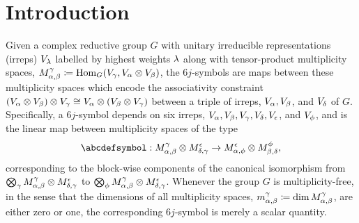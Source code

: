 \documentclass[notitlepage, 10pt]{article}
\begin{document}
\tableofcontents

\section{Introduction}

Given a complex reductive group $G$ with unitary irreducible representations (irreps) $V_{\lambda}$ labelled by highest weights $\lambda$ along with tensor-product multiplicity spaces, $M^{\gamma}_{\alpha,\beta} \coloneqq \operatorname{Hom}_G(V_{\gamma}, V_{\alpha}\otimes V_{\beta})$, the $6j$-symbols are maps between these multiplicity spaces which encode the associativity constraint $(V_\alpha \otimes V_\beta) \otimes V_\gamma \cong V_\alpha \otimes (V_\beta \otimes V_\gamma)$ between a triple of irreps, $V_\alpha, V_\beta$, and $V_\delta$ of $G$.
Specifically, a $6j$-symbol depends on six irreps, $V_{\alpha}, V_{\beta}, V_{\gamma}, V_{\delta}, V_{\epsilon}$, and $V_{\phi}$, and is the linear map between multiplicity spaces of the type
\begin{equation*}
    \abcdefsymbol
    :
    M^{\yc}_{\ya,\yb} \ot M^{\ye}_{\yd,\yc} \to M^{\ye}_{\ya, \yf} \ot M^{\yf}_{\yb,\yd},
\end{equation*}
corresponding to the block-wise components of the canonical isomorphism from $\bigotimes_{\gamma} M^{\gamma}_{\alpha,\beta} \otimes M^{\epsilon}_{\delta,\gamma}$ to $\bigotimes_{\phi} M^{\gamma}_{\alpha,\beta} \otimes M^{\epsilon}_{\delta,\gamma}$.
Whenever the group $G$ is multiplicity-free, in the sense that the dimensions of all multiplicity spaces, $m^{\gamma}_{\alpha,\beta} \coloneqq \dim M^{\gamma}_{\alpha,\beta}$, are either zero or one, the corresponding $6j$-symbol is merely a scalar quantity.
\end{document}

